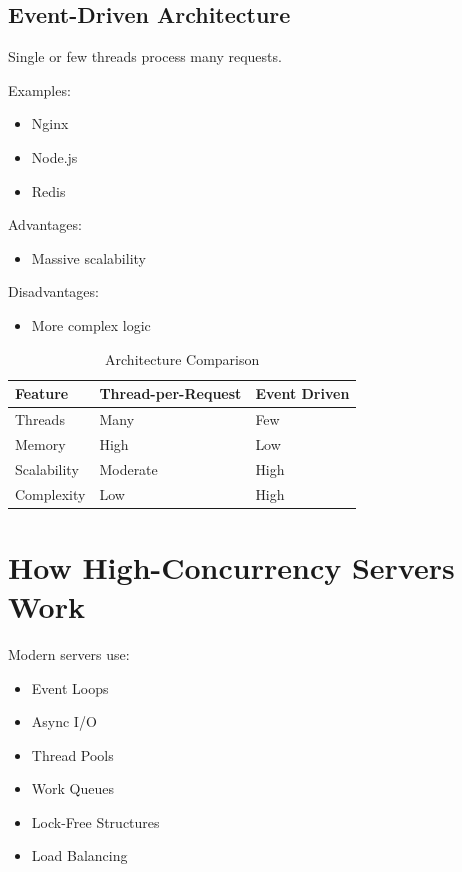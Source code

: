 \subsection{Event-Driven Architecture}

Single or few threads process many requests.

Examples:

\begin{itemize}
\item Nginx
\item Node.js
\item Redis
\end{itemize}

Advantages:

\begin{itemize}
\item Massive scalability
\end{itemize}

Disadvantages:

\begin{itemize}
\item More complex logic
\end{itemize}

\begin{table}[h]
\centering
\begin{tabular}{|p{5cm}|p{4cm}|p{4cm}|}
\hline
Feature & Thread-per-Request & Event Driven \\
\hline
Threads & Many & Few \\
\hline
Memory & High & Low \\
\hline
Scalability & Moderate & High \\
\hline
Complexity & Low & High \\
\hline
\end{tabular}
\caption{Architecture Comparison}
\end{table}

\section{How High-Concurrency Servers Work}

Modern servers use:

\begin{itemize}
\item Event Loops
\item Async I/O
\item Thread Pools
\item Work Queues
\item Lock-Free Structures
\item Load Balancing
\end{itemize}

